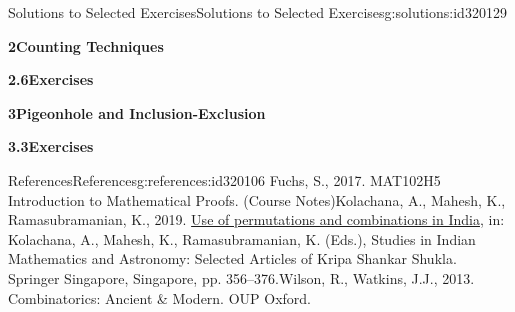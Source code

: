 \documentclass[oneside,10pt,]{book}
\newcommand{\blocktitlefont}{\relax}
\numberwithin{equation}{section}
\begin{document}
\begin{solutions-chapter}{Solutions to Selected Exercises}{}{Solutions to Selected Exercises}{}{}{g:solutions:id320129}
\par\smallskip
\noindent\textbf{\Large{}2\space\textperiodcentered\space{}Counting Techniques}
\par\smallskip
\par\smallskip
\noindent\textbf{\Large{}2.6\space\textperiodcentered\space{}Exercises}
\par\smallskip
{}%
%
\par\smallskip
\noindent\textbf{\Large{}3\space\textperiodcentered\space{}Pigeonhole and Inclusion-Exclusion}
\par\smallskip
\par\smallskip
\noindent\textbf{\Large{}3.3\space\textperiodcentered\space{}Exercises}
\par\smallskip
{}%
%
\end{solutions-chapter}
%
\backmatter
%
%
%
\typeout{************************************************}
\typeout{************************************************}
%
\begin{references-chapter-numberless}{References}{}{References}{}{}{g:references:id320106}
Fuchs, S., 2017. MAT102H5 Introduction to Mathematical Proofs. (Course Notes)Kolachana, A., Mahesh, K., Ramasubramanian, K., 2019. \href{https://doi.org/10.1007/978-981-13-7326-8_18}{Use of permutations and combinations in India}, in: Kolachana, A., Mahesh, K., Ramasubramanian, K. (Eds.), Studies in Indian Mathematics and Astronomy: Selected Articles of Kripa Shankar Shukla. Springer Singapore, Singapore, pp. 356–376.Wilson, R., Watkins, J.J., 2013. Combinatorics: Ancient \& Modern. OUP Oxford.\end{references-chapter-numberless}
\end{document}

